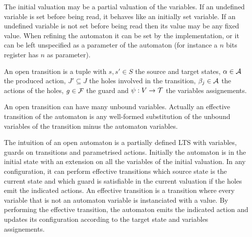 \documentclass{article}
\begin{document}
The initial valuation may be a partial valuation of the variables.
If an undefined variable is set before being read, it behaves like an initially set variable.
If an undefined variable is not set before being read then its value may be any fixed value.
When refining the automaton it can be set by the implementation, or it can be left unspecified as a parameter of the automaton (for instance a \(n\) bits register has \(n\) as parameter).
\begin{defi}
An open transition is a tuple \nmm{\OTg} with \(s, s' \in S\) the source and target states, \(\alpha \in \mathcal{A}\) the produced action, \(J' \subseteq J\) the holes involved in the transition, \(\beta_j \in \mathcal{A}\) the actions of the holes, \(g \in {\mathcal{F}}\) the guard and \(\psi: V \to {\mathcal{T}}\) the variables assignements.
\end{defi}
An open transition can have many unbound variables.
Actually an effective transition of the automaton is any well-formed substitution of the unbound variables of the transition minus the automaton variables.

The intuition of an open automaton is a partially defined LTS with variables, guards on transitions and parametrised actions.
Initially the automaton is in the initial state with an extension on all the variables of the initial valuation.
In any configuration, it can perform effective transitions which source state is the current state and which guard is satisfiable in the current valuation if the holes emit the indicated actions.
An effective transition is a transition where every variable that is not an automaton variable is instanciated with a value.
By performing the effective transition, the automaton emits the indicated action and updates its configuration according to the target state and variables assignements.
\end{document}
